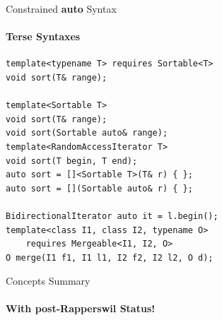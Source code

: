 \documentclass{beamer}
\begin{document}
    \begin{frame}[fragile]{Constrained \textbf{auto} Syntax}
        \framesubtitle{Terse Syntaxes}
        \begin{center}
        \begin{lstlisting}
template<typename T> requires Sortable<T>
void sort(T& range);

template<Sortable T>
void sort(T& range);
void sort(Sortable auto& range);
template<RandomAccessIterator T>
void sort(T begin, T end);
auto sort = []<Sortable T>(T& r) { };
auto sort = [](Sortable auto& r) { };

BidirectionalIterator auto it = l.begin();
template<class I1, class I2, typename O>
    requires Mergeable<I1, I2, O>
O merge(I1 f1, I1 l1, I2 f2, I2 l2, O d); \end{lstlisting}
        \end{center}
    \end{frame}

    \begin{frame}[fragile]{Concepts Summary}
        \framesubtitle{With post-Rapperswil Status!}
    \end{frame}
\end{document}
